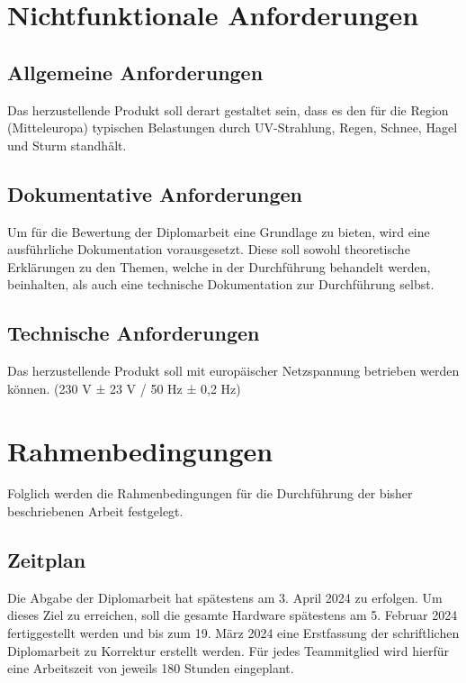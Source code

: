 \section{Nichtfunktionale Anforderungen}
\subsection{Allgemeine Anforderungen}
Das herzustellende Produkt soll derart gestaltet sein, dass es den für die Region (Mitteleuropa) typischen 
Belastungen durch UV-Strahlung, Regen, Schnee, Hagel und Sturm standhält.\\ 

\subsection{Dokumentative Anforderungen}
Um für die Bewertung der Diplomarbeit eine Grundlage zu bieten, wird eine ausführliche 
Dokumentation vorausgesetzt. Diese soll sowohl theoretische Erklärungen zu den Themen, welche 
in der Durchführung behandelt werden, beinhalten, als auch eine technische Dokumentation zur Durchführung selbst.\\

\subsection{Technische Anforderungen}
Das herzustellende Produkt soll mit europäischer Netzspannung betrieben werden können. (230 V 
± 23 V / 50 Hz ± 0,2 Hz)\\

\section{Rahmenbedingungen}
Folglich werden die Rahmenbedingungen für die Durchführung der bisher beschriebenen 
Arbeit festgelegt.\\

\subsection{Zeitplan}
Die Abgabe der Diplomarbeit hat spätestens am 3. April 2024 zu erfolgen. Um dieses Ziel zu 
erreichen, soll die gesamte Hardware spätestens am 5. Februar 2024 fertiggestellt werden und bis 
zum 19. März 2024 eine Erstfassung der schriftlichen Diplomarbeit zu Korrektur erstellt werden. Für 
jedes Teammitglied wird hierfür eine Arbeitszeit von jeweils 180 Stunden eingeplant.\\

